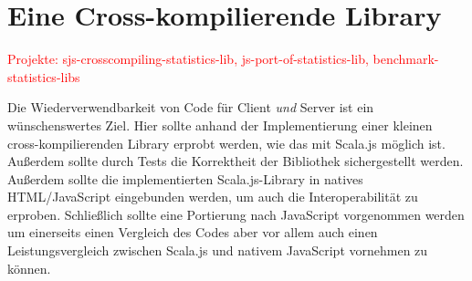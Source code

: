 \documentclass[a4paper, 12pt, hidelinks, listof=totoc, listoftables=totoc, bibliography=totoc]{scrreprt}
\newcommand{\TODO}[1]{\textcolor{red}{#1}\newline}
\begin{document}
%

\section{Eine Cross-kompilierende Library}

\TODO{Projekte: sjs-crosscompiling-statistics-lib, js-port-of-statistics-lib, benchmark-statistics-libs}

Die Wiederverwendbarkeit von Code für Client \emph{und} Server ist ein wünschenswertes Ziel. Hier sollte anhand der Implementierung einer kleinen cross-kompilierenden Library erprobt werden, wie das mit Scala.js möglich ist. Außerdem sollte durch Tests die Korrektheit der Bibliothek sichergestellt werden. 
Außerdem sollte die implementierten Scala.js-Library in natives HTML/JavaScript eingebunden werden, um auch die Interoperabilität zu erproben. Schließlich sollte eine Portierung nach JavaScript vorgenommen werden um einerseits einen Vergleich des Codes aber vor allem auch einen Leistungsvergleich zwischen Scala.js und nativem JavaScript vornehmen zu können.
\end{document}
